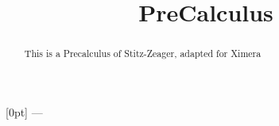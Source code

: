 \documentclass[12pt]{xourse}
\title{PreCalculus}
\begin{document}
\begin{abstract}
This is a Precalculus of Stitz-Zeager, adapted for Ximera
\end{abstract} 

\maketitle

%
%
\ifdefined\HCode
\providecommand\subpart{}
[0pt]{\normalfont\bfseries}%
{\thecontentslabel\enspace ---\enspace\large}%
{\normalfont\large\bfseries}{\hspace{2em plus 1fill}\large\contentspage}

%
\setcounter{ximera@subpart}{0}%
\renewcommand\subpart[1]{%
  \stepcounter{ximera@subpart}%
  \stepcounter{subpart}%
  \ifnumberactivitiesbysubpart%
    \setcounter{titlenumber}{0}%
    \setcounter{sectiontitlenumber}{0}%
  \fi%
  \ifvmode \IgnorePar\fi \EndP%
  \HCode{<h2 id="subpart\arabic{ximera@subpart}" class="card subpart" data-toc-label="\thesubpart">}#1\HCode{</h2>\Hnewline}%
  \IgnoreIndent%
}

\renewcommand{\thepart}{\arabic{part}}
\providecommand{\thesubpart}{}%
\renewcommand{\thesubpart}{%
  \arabic{subpart}%
}
\renewcommand{\thetitlenumber}{%
    \ifnumberactivitiesbysubpart%
        \thesubpart.\arabic{titlenumber}%
    \else%
        \thepart.\arabic{titlenumber}%
    \fi%
}
\renewcommand{\thesectiontitlenumber}{\thetitlenumber.\arabic{sectiontitlenumber}}


\renewcommand\chapterstyle{%
  \def\activitystyle{chapter}%
  \setcounter{sectiontitlenumber}{0}%
  \ifaddtitlenumber%
    \addtocounter{titlenumber}{1}%
    \def\activitytoclabel{\thetitlenumber}%
  \else%
    \def\activitytoclabel{}%
  \fi%
}
\renewcommand\sectionstyle{%
  \def\activitystyle{section}%
  \ifaddsectiontitlenumber%
    \addtocounter{sectiontitlenumber}{1}%
    \def\activitytoclabel{\thesectiontitlenumber}%
  \else%
    \def\activitytoclabel{}%
  \fi%
}
\end{document}
